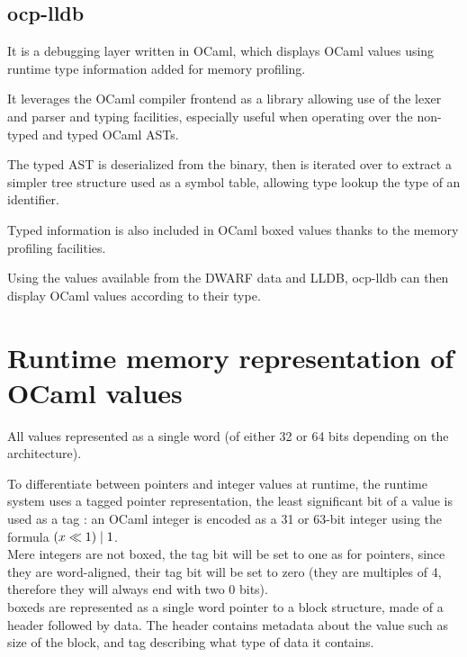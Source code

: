 \subsection{ocp-lldb}

It is a debugging layer written in OCaml,
which displays OCaml values using runtime type information added for memory profiling.

It leverages the OCaml compiler frontend as a library
allowing use of the lexer and parser and typing facilities,
especially useful when operating over the non-typed and typed OCaml ASTs.

The typed AST is deserialized from the binary, then is iterated over to extract a simpler tree
structure used as a symbol table, allowing type lookup the type of an
identifier.

Typed information is also included in OCaml boxed values thanks to the memory
profiling facilities.

Using the values available from the DWARF data and LLDB, ocp-lldb can then display
OCaml values according to their type.

\section{Runtime memory representation of OCaml values}

All values represented as a single word (of either 32 or 64 bits depending on
the architecture).

To differentiate between pointers and integer values at runtime, the runtime
system uses a tagged pointer representation, the least significant bit of a
value is used as a tag : an OCaml integer is encoded as a 31 or 63-bit integer
using the formula $ (x \ll 1) \mathrel{|} 1 $.\\

\vspace{1mm}
Mere integers are not boxed, the tag bit will be set to one
as for pointers, since they are word-aligned, their tag bit will be set to zero
(they are multiples of 4, therefore they will always end with two 0 bits).\\

\vspace{1mm}
\Glspl{boxed} are represented as a single word pointer to a block structure, made of a
header followed by data.
The header contains metadata about the value such as size of the block, and tag describing what type of data it
contains.

